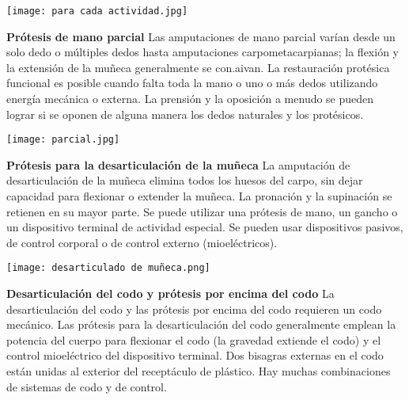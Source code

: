 \documentclass{article}
\begin{document}
\hspace{1cm} 

\begin{minipage}{.89\linewidth}
\centering
\texttt{[image: para cada actividad.jpg]}
\end{minipage}


\hspace{1cm} 


\textbf {Prótesis de mano parcial}
Las amputaciones de mano parcial varían desde un solo dedo o múltiples dedos hasta amputaciones carpometacarpianas; la flexión y la extensión de la muñeca generalmente se con.aivan. La restauración protésica funcional es posible cuando falta toda la mano o uno o más dedos utilizando energía mecánica o externa. La prensión y la oposición a menudo se pueden lograr si se oponen de alguna manera los dedos naturales y los protésicos.

\hspace{1cm} 

\begin{minipage}{.89\linewidth}
\centering
\texttt{[image: parcial.jpg]}
\end{minipage}


\hspace{2cm} 

\textbf {Prótesis para la desarticulación de la muñeca}
La amputación de desarticulación de la muñeca elimina todos los huesos del carpo, sin dejar capacidad para flexionar o extender la muñeca. La pronación y la supinación se retienen en su mayor parte. Se puede utilizar una prótesis de mano, un gancho o un dispositivo terminal de actividad especial. Se pueden usar dispositivos pasivos, de control corporal o de control externo (mioeléctricos).

\hspace{0.5cm} 

\begin{minipage}{.89\linewidth}
\centering
\texttt{[image: desarticulado de muñeca.png]}
\end{minipage}


\textbf {Desarticulación del codo y prótesis por encima del codo}
La desarticulación del codo y las prótesis por encima del codo requieren un codo mecánico. Las prótesis para la desarticulación del codo generalmente emplean la potencia del cuerpo para flexionar el codo (la gravedad extiende el codo) y el control mioeléctrico del dispositivo terminal. Dos bisagras externas en el codo están unidas al exterior del receptáculo de plástico. Hay muchas combinaciones de sistemas de codo y de control.
\end{document}
